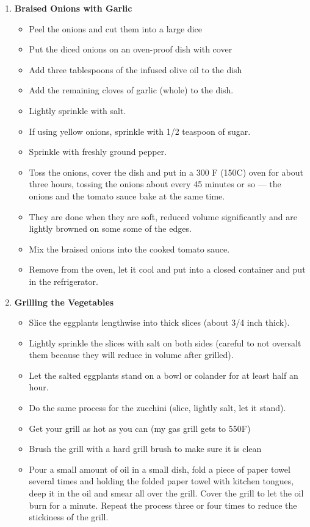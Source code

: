 \documentclass [11pt, letterpaper] {article}
\begin{document}
\begin{description}
\begin{enumerate}
\begin{itemize}
	\end{itemize}
	\item {\bf Braised Onions with Garlic}
	\begin{itemize}
        		\item Peel the onions and cut them into a large dice
		\item Put the diced onions on an oven-proof dish with cover 
		\item Add three tablespoons of the infused olive oil to the dish
		\item Add the remaining cloves of garlic (whole) to the dish.
		\item Lightly sprinkle with salt.
		\item If using yellow onions, sprinkle with 1/2 teaspoon of sugar.
		\item Sprinkle with freshly ground pepper.
		\item Toss the onions, cover the dish and put in a 300 F (150C) oven for about three hours, tossing the onions about every 45 minutes or so --- the onions and the tomato sauce bake at the same time.
		\item They are done when they are soft, reduced volume significantly and are lightly browned on some some of the edges.
		\item Mix the braised onions into the cooked tomato sauce.
		\item Remove from the oven, let it cool and put into a closed container and put in the refrigerator.
	\end{itemize}
	\item {\bf Grilling the Vegetables}
	\begin{itemize}	
		\item  Slice the eggplants lengthwise into thick slices (about 3/4 inch thick).
		\item Lightly sprinkle the slices with salt on both sides (careful to not oversalt them because they will reduce in volume after grilled).
		\item Let the salted eggplants stand on a bowl or colander for at least half an hour.
		\item Do the same process for the zucchini (slice, lightly salt, let it stand).
		\item Get your grill as hot as you can (my gas grill gets to 550F)
	 	\item Brush the grill with a hard grill brush to make sure it is clean
	 	\item Pour a small amount of oil in a small dish, fold a piece of paper towel several times and holding the folded paper towel with kitchen tongues, deep it in the oil and smear all over the grill. Cover the grill to let the oil burn for a minute. Repeat the process three or four times to reduce the stickiness of the grill. 

\end{itemize}
\end{enumerate}
\end{description}
\end{document}
